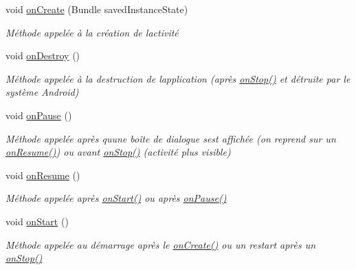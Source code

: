 \begin{DoxyCompactItemize}
\item 
void \hyperlink{classcom_1_1example_1_1area_1_1_i_h_m_gestion_partie_a501249e0f0625aa3e0784ce5f2b51cd8}{on\+Create} (Bundle saved\+Instance\+State)
\begin{DoxyCompactList}\small\item\em Méthode appelée à la création de l\textquotesingle{}activité \end{DoxyCompactList}\item 
void \hyperlink{classcom_1_1example_1_1area_1_1_i_h_m_gestion_partie_a5706132cc0d20b0c4a67fdc2e9c94a4e}{on\+Destroy} ()
\begin{DoxyCompactList}\small\item\em Méthode appelée à la destruction de l\textquotesingle{}application (après \hyperlink{classcom_1_1example_1_1area_1_1_i_h_m_gestion_partie_a67aa6746480bdba2a5744a2ff8d6c48d}{on\+Stop()} et détruite par le système Android) \end{DoxyCompactList}\item 
void \hyperlink{classcom_1_1example_1_1area_1_1_i_h_m_gestion_partie_a05a8b1eabc376a9d06150eaed696e53e}{on\+Pause} ()
\begin{DoxyCompactList}\small\item\em Méthode appelée après qu\textquotesingle{}une boîte de dialogue s\textquotesingle{}est affichée (on reprend sur un \hyperlink{classcom_1_1example_1_1area_1_1_i_h_m_gestion_partie_a8ebd633d46edcc3218f4b5a5826c0163}{on\+Resume()}) ou avant \hyperlink{classcom_1_1example_1_1area_1_1_i_h_m_gestion_partie_a67aa6746480bdba2a5744a2ff8d6c48d}{on\+Stop()} (activité plus visible) \end{DoxyCompactList}\item 
void \hyperlink{classcom_1_1example_1_1area_1_1_i_h_m_gestion_partie_a8ebd633d46edcc3218f4b5a5826c0163}{on\+Resume} ()
\begin{DoxyCompactList}\small\item\em Méthode appelée après \hyperlink{classcom_1_1example_1_1area_1_1_i_h_m_gestion_partie_a132b61f448998b41a12ef50994350c92}{on\+Start()} ou après \hyperlink{classcom_1_1example_1_1area_1_1_i_h_m_gestion_partie_a05a8b1eabc376a9d06150eaed696e53e}{on\+Pause()} \end{DoxyCompactList}\item 
void \hyperlink{classcom_1_1example_1_1area_1_1_i_h_m_gestion_partie_a132b61f448998b41a12ef50994350c92}{on\+Start} ()
\begin{DoxyCompactList}\small\item\em Méthode appelée au démarrage après le \hyperlink{classcom_1_1example_1_1area_1_1_i_h_m_gestion_partie_a501249e0f0625aa3e0784ce5f2b51cd8}{on\+Create()} ou un restart après un \hyperlink{classcom_1_1example_1_1area_1_1_i_h_m_gestion_partie_a67aa6746480bdba2a5744a2ff8d6c48d}{on\+Stop()} \end{DoxyCompactList}\item 

\end{DoxyCompactItemize}
